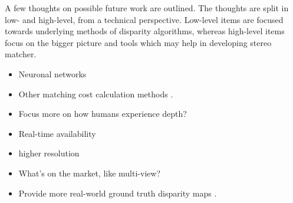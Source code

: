 A few thoughts on possible future work are outlined.
The thoughts are split in low- and high-level, from a technical perspective.
Low-level items are focused towards underlying methods of disparity algorithms, whereas high-level items focus on the bigger picture and tools which may help in developing stereo matcher.

\begin{itemize}
  \item Neuronal networks \citep{olshausen1996emergence}
  \item Other matching cost calculation methods \citep{hermann2010gradient}.
  \item Focus more on how humans experience depth? \citep{deangelis1995neuronal}
\end{itemize}

\begin{itemize}
  \item Real-time availability
  \item higher resolution
  \item What's on the market, like multi-view?
  \item Provide more real-world ground truth disparity maps \citep{kondermann2015stereo, Geiger2011IV}.
\end{itemize}
